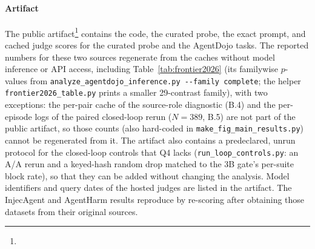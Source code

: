 \paragraph{Artifact}
The public artifact\footnote{\artifactURL} contains the code, the curated probe, the exact
prompt, and cached judge scores for the curated probe and the AgentDojo tasks.
The reported numbers for these two sources regenerate from the caches without
model inference or API access, including Table~\ref{tab:frontier2026} (its familywise
$p$-values from \texttt{analyze\_agentdojo\_inference.py -{}-family complete}; the helper
\texttt{frontier2026\_table.py} prints a smaller 29-contrast family), with two exceptions: the
per-pair cache of the source-role diagnostic (B.4) and the per-episode logs of the paired
closed-loop rerun ($N=389$, B.5) are not part of the public artifact, so those counts (also
hard-coded in \texttt{make\_fig\_main\_results.py}) cannot be regenerated
from it. The artifact also contains a predeclared, unrun protocol for the closed-loop controls that Q4 lacks
(\texttt{run\_loop\_controls.py}: an A/A rerun and a keyed-hash random drop matched to the 3B gate's per-suite
block rate), so that they can be added without changing the analysis. Model identifiers and query dates of the hosted judges are listed in the artifact. The InjecAgent and
AgentHarm results reproduce by re-scoring after obtaining those datasets from
their original sources.
